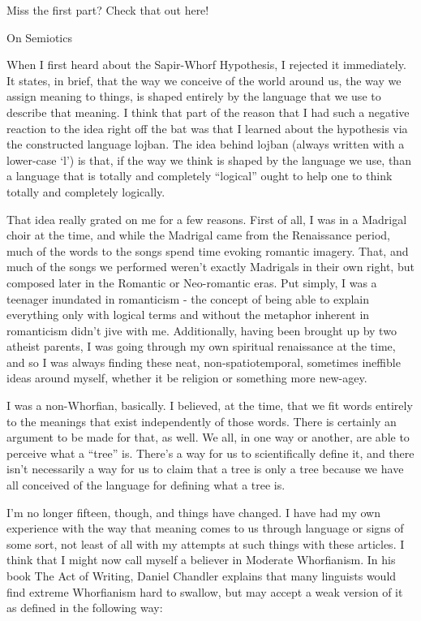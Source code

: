 Miss the first part? Check that out here!

On Semiotics

When I first heard about the Sapir-Whorf Hypothesis, I rejected it immediately. It states, in brief, that the way we conceive of the world around us, the way we assign meaning to things, is shaped entirely by the language that we use to describe that meaning. I think that part of the reason that I had such a negative reaction to the idea right off the bat was that I learned about the hypothesis via the constructed language lojban. The idea behind lojban (always written with a lower-case `l') is that, if the way we think is shaped by the language we use, than a language that is totally and completely ``logical'' ought to help one to think totally and completely logically.

That idea really grated on me for a few reasons. First of all, I was in a Madrigal choir at the time, and while the Madrigal came from the Renaissance period, much of the words to the songs spend time evoking romantic imagery. That, and much of the songs we performed weren't exactly Madrigals in their own right, but composed later in the Romantic or Neo-romantic eras. Put simply, I was a teenager inundated in romanticism - the concept of being able to explain everything only with logical terms and without the metaphor inherent in romanticism didn't jive with me. Additionally, having been brought up by two atheist parents, I was going through my own spiritual renaissance at the time, and so I was always finding these neat, non-spatiotemporal, sometimes ineffible ideas around myself, whether it be religion or something more new-agey.

I was a non-Whorfian, basically. I believed, at the time, that we fit words entirely to the meanings that exist independently of those words. There is certainly an argument to be made for that, as well. We all, in one way or another, are able to perceive what a ``tree'' is. There's a way for us to scientifically define it, and there isn't necessarily a way for us to claim that a tree is only a tree because we have all conceived of the language for defining what a tree is.

I'm no longer fifteen, though, and things have changed. I have had my own experience with the way that meaning comes to us through language or signs of some sort, not least of all with my attempts at such things with these articles. I think that I might now call myself a believer in Moderate Whorfianism. In his book The Act of Writing, Daniel Chandler explains that many linguists would find extreme Whorfianism hard to swallow, but may accept a weak version of it as defined in the following way:

